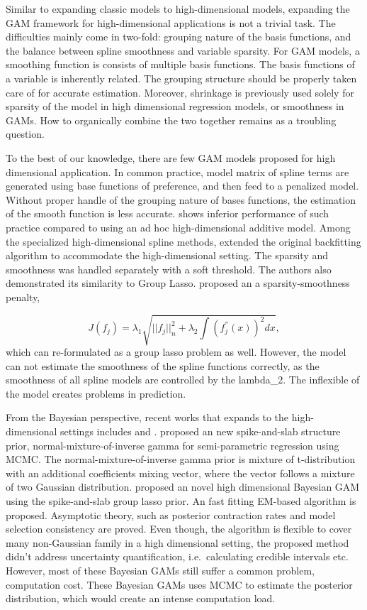 \documentclass[AMA,STIX1COL,]{WileyNJD-v2}
\begin{document}
Similar to expanding classic models to high-dimensional models,
expanding the GAM framework for high-dimensional applications is not a
trivial task. The difficulties mainly come in two-fold: grouping nature
of the basis functions, and the balance between spline smoothness and
variable sparsity. For GAM models, a smoothing function is consists of
multiple basis functions. The basis functions of a variable is
inherently related. The grouping structure should be properly taken care
of for accurate estimation. Moreover, shrinkage is previously used
solely for sparsity of the model in high dimensional regression models,
or smoothness in GAMs. How to organically combine the two together
remains as a troubling question.

To the best of our knowledge, there are few GAM models proposed for high
dimensional application. In common practice, model matrix of spline
terms are generated using base functions of preference, and then feed to
a penalized model. Without proper handle of the grouping nature of bases
functions, the estimation of the smooth function is less accurate.
\citet{Bai2020Spline} shows inferior performance of such practice
compared to using an ad hoc high-dimensional additive model. Among the
specialized high-dimensional spline methods, \citet{Ravikumar2009}
extended the original backfitting algorithm \citep{Hastie1987} to
accommodate the high-dimensional setting. The sparsity and smoothness
was handled separately with a soft threshold. The authors also
demonstrated its similarity to Group Lasso. \citet{Meier2009} proposed
an a sparsity-smoothness penalty,

\[
J(f_j) = \lambda_1 \sqrt{||f_j||^2_n + \lambda_2 \int(f^{''}_j(x))^2dx},
\] which can re-formulated as a group lasso problem as well. However,
the model can not estimate the smoothness of the spline functions
correctly, as the smoothness of all spline models are controlled by the
lambda\_2. The inflexible of the model creates problems in prediction.

From the Bayesian perspective, recent works that expands to the
high-dimensional settings includes \citet{Scheipl2012} and
\citet{Bai2020Spline}. \citet{Scheipl2012} proposed an new
spike-and-slab structure prior, normal-mixture-of-inverse gamma for
semi-parametric regression using MCMC. The normal-mixture-of-inverse
gamma prior is mixture of t-distribution with an additional coefficients
mixing vector, where the vector follows a mixture of two Gaussian
distribution. \citet{Bai2020Spline} proposed an novel high dimensional
Bayesian GAM using the spike-and-slab group lasso prior. An fast fitting
EM-based algorithm is proposed. Asymptotic theory, such as posterior
contraction rates and model selection consistency are proved. Even
though, the algorithm is flexible to cover many non-Gaussian family in a
high dimensional setting, the proposed method didn't address uncertainty
quantification, i.e.~calculating credible intervals etc. However, most
of these Bayesian GAMs still suffer a common problem, computation cost.
These Bayesian GAMs uses MCMC to estimate the posterior distribution,
which would create an intense computation load.
\end{document}

